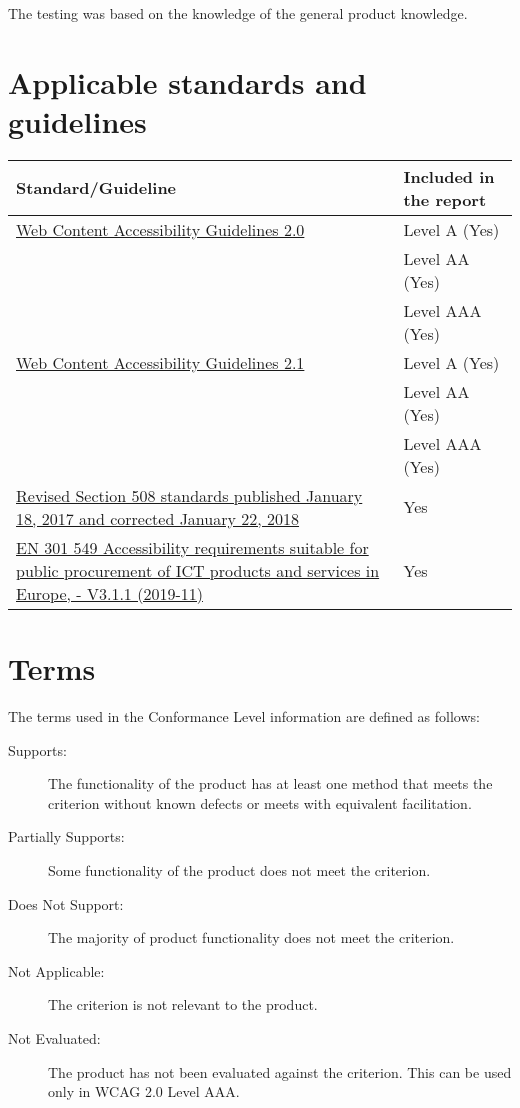 \documentclass[titlepage]{article}
\newlength\vpattempcollen
\begin{document}
The testing was based on the knowledge of the general product
knowledge.

\section{Applicable standards and guidelines}
\label{sec:standards}

\settowidth{}

\begin{tabular}{p{\dimexpr\textwidth-\vpattempcollen-4\tabcolsep}l}
  \toprule
  Standard/Guideline  & Included in the report\\
  \midrule
  \href{http://www.w3.org/TR/2008/REC-WCAG20-20081211}{Web Content
  Accessibility Guidelines 2.0} & Level A (Yes) \\
                      & Level AA (Yes)\\
                      & Level AAA (Yes)\\\addlinespace
  \href{https://www.w3.org/TR/WCAG21}{Web Content Accessibility
  Guidelines 2.1} & Level A (Yes) \\
                      & Level AA (Yes)\\
                      & Level AAA (Yes)\\\addlinespace
  \href{https://www.access-board.gov/guidelines-and-standards/communications-and-it/about-the-ict-refresh/final-rule/text-of-the-standards-and-guidelines}{Revised Section 508 standards published January 18, 2017 and
  corrected January 22, 2018} & Yes\\\addlinespace
  \href{https://www.etsi.org/deliver/etsi_en/301500_301599/301549/03.01.01_60/en_301549v030101p.pdf}{EN
  301 549 Accessibility requirements suitable for public procurement
  of ICT products and services in Europe, - V3.1.1 (2019-11)} & Yes\\
  \bottomrule
\end{tabular}


\section{Terms}
\label{sec:terms}

The terms used in the Conformance Level information are defined as follows:
\begin{description}
\item[Supports:] The functionality of the product has at least one
  method that meets the criterion without known defects or meets with
  equivalent facilitation.
\item[Partially Supports:] Some functionality of the product does not
  meet the criterion.
\item[Does Not Support:] The majority of product functionality does
  not meet the criterion.
\item[Not Applicable:] The criterion is not relevant to the product.
\item[Not Evaluated:] The product has not been evaluated against the
  criterion. This can be used only in WCAG 2.0 Level AAA.

\end{description}
\end{document}
